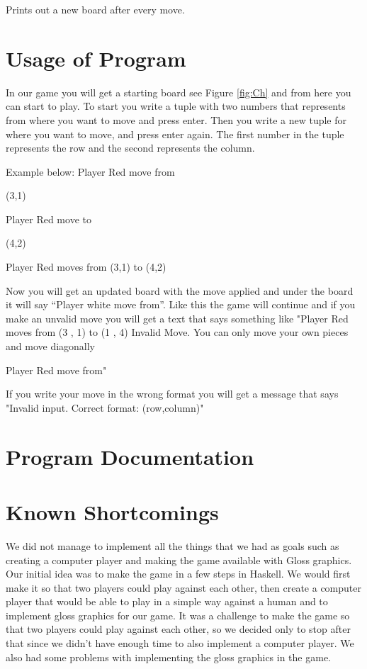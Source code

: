 \documentclass[12pt,a4paper]{article}
\begin{document}
Prints out a new board after every move.

\section{Usage of Program}
In our game you will get a starting board see Figure \ref{fig:Ch} and from here you can start to play. To start you write a tuple with two numbers that represents from where you want to move and press enter. Then you write a new tuple for where you want to move, and press enter again. The first number in the tuple represents the row and the second represents the column.

Example below:
Player Red move from

(3,1)

Player Red move to

(4,2)

Player Red moves from  (3,1)  to  (4,2)

Now you will get an updated board with the move applied and under the board it will say “Player white move from”. Like this the game will continue and if you make an unvalid move you will get a text that says something like "Player Red moves from  (3 , 1)  to  (1 , 4)
Invalid Move. You can only move your own pieces and move diagonally

Player Red move from"

If you write your move in the wrong format you will get a message that says "Invalid input. Correct format: (row,column)"
\section{Program Documentation}

\section{Known Shortcomings}
We did not manage to implement all the things that we had as goals such as creating a computer player and making the game available with Gloss graphics.
Our initial idea was to make the game in a few steps in Haskell. We would first make it so that two players could play against each other, then create a computer player that would be able to play in a simple way against a human and to implement gloss graphics for our game. It was a challenge to make the game so that two players could play against each other, so we decided only to stop after that since we didn’t have enough time to also implement a computer player. We also had some problems with implementing the gloss graphics in the game.
\end{document}
